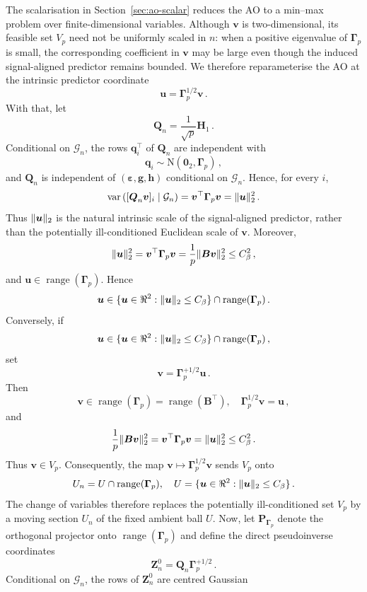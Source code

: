 \documentclass{article}
\makeatletter
\DeclareMathOperator{\var}{var}
\theoremstyle{definition}
\newcommand{\vnorm}[1]{%
	\ensuremath{%
		\if@display
		\left\| #1 \right\|
		\else
		\| #1 \|
		\fi
	}%
}
\newcommand*{\bb}{\boldsymbol}
\def\bH {\bb{H}}
\def\bu{\bb{u}}
\def\bv{\bb{v}}
\def\bh{\bb{h}}
\def\bg{\bb{g}}
\def\bB{\bb{B}}
\def\bH{\bb{H}}
\newcommand{\range}{\operatorname{range}}
\makeatother
\begin{document}
\begin{bibunit}
The scalarisation in Section~\ref{sec:ao-scalar} reduces the AO to a
min--max problem over finite-dimensional variables. Although $\bv$ is
two-dimensional, its feasible set $V_p$ need not be uniformly scaled in
$n$: when a positive eigenvalue of $\bb\Gamma_p$ is small, the corresponding
coefficient in $\bv$ may be large even though the induced signal-aligned
predictor remains bounded. We therefore reparameterise the AO at the intrinsic predictor
coordinate
$$
	\bu
    =
    \bb\Gamma_p^{1/2}\bv\,.
$$
With that, let
$$
    \bb Q_n
    =
    \frac1{\sqrt p}\bH_1\,.
$$
Conditional on $\mathcal G_n$, the rows $\bb q_i^\top$ of $\bb Q_n$ are
independent with
$$
    \bb q_i
    \sim
    \mathrm N(\bb0_2,\bb\Gamma_p)\,,
$$
and $\bb Q_n$ is independent of
$(\bb\varepsilon,\bg,\bh)$ conditional on $\mathcal G_n$.
Hence, for every $i$,
$$
    \var\left(
        [\bb Q_n\bv]_i
        \mid
        \mathcal G_n
    \right)
    =
    \bv^\top\bb\Gamma_p\bv
    =
    \vnorm{\bu}_2^2\,.
$$
Thus $\vnorm{\bu}_2$ is the natural intrinsic scale of the signal-aligned
predictor, rather than the potentially ill-conditioned Euclidean scale of
$\bv$. Moreover,
$$
    \vnorm{\bu}_2^2
    =
    \bv^\top\bb\Gamma_p\bv
    =
    \frac1p\vnorm{\bB\bv}_2^2
    \leq
    C_\beta^2\,,
$$
and
$
    \bu\in\range(\bb\Gamma_p)
$.
Hence
$$
    \bu
    \in
    \{\bu\in\Re^2:\vnorm{\bu}_2\leq C_\beta\}
    \cap
    \range(\bb\Gamma_p)\,.
$$
Conversely, if
$$
    \bu
    \in
    \{\bu\in\Re^2:\vnorm{\bu}_2\leq C_\beta\}
    \cap
    \range(\bb\Gamma_p)\,,
$$
set
$$
    \bv
    =
    \bb\Gamma_p^{+1/2}\bu\,.
$$
Then
$$
    \bv
    \in
    \range(\bb\Gamma_p)
    =
    \range(\bB^\top),
    \quad
    \bb\Gamma_p^{1/2}\bv
    =
    \bu\,,
$$
and
$$
    \frac1p\vnorm{\bB\bv}_2^2
    =
    \bv^\top\bb\Gamma_p\bv
    =
    \vnorm{\bu}_2^2
    \leq
    C_\beta^2\,.
$$
Thus $\bv\in V_p$. Consequently, the map
$
    \bv\mapsto\bb\Gamma_p^{1/2}\bv
$
sends $V_p$ onto
\begin{equation}
\label{eq:finite_signal_domain}
    U_n
    =
    U
    \cap
    \range(\bb\Gamma_p),
    \quad
    U
    =
    \{\bu\in\Re^2:\vnorm{\bu}_2\leq C_\beta\}\,.
\end{equation}
The change of variables therefore replaces the potentially ill-conditioned
set $V_p$ by a moving section $U_n$ of the fixed ambient ball $U$.
Now, let $\bb P_{\bb \Gamma_p}$ denote the orthogonal projector onto
$\range(\bb\Gamma_p)$ and define the direct pseudoinverse coordinates
$$
    \bb Z_n^0
    =
    \bb Q_n\bb\Gamma_p^{+1/2}\,.
$$
Conditional on $\mathcal G_n$, the rows of $\bb Z_n^0$ are centred Gaussian

\end{bibunit}
\end{document}
